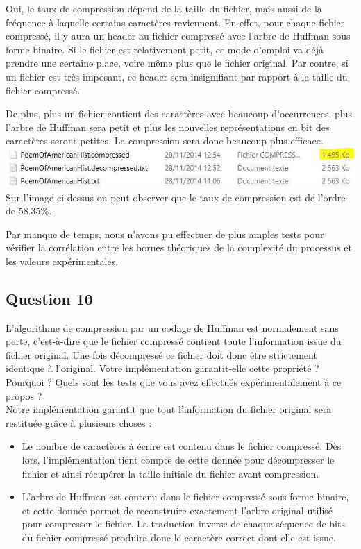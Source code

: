 \documentclass[11pt]{article}
\begin{document}
Oui, le taux de compression dépend de la taille du fichier, mais aussi de la fréquence à laquelle certains caractères	reviennent. En effet, pour chaque fichier compressé, il y aura un header au fichier compressé avec l'arbre de Huffman sous forme binaire. Si le fichier est relativement petit, ce mode d'emploi va déjà prendre une certaine place, voire même plus que le fichier original. Par contre, si un fichier est très imposant, ce header sera insignifiant par rapport à la taille du fichier compressé.

De plus, plus un fichier contient des caractères avec beaucoup d'occurrences, plus l'arbre de Huffman sera petit et plus les nouvelles représentations en bit des caractères seront petites. La compression sera donc beaucoup plus efficace. \\

\includegraphics[scale=0.5]{compression.jpg}\\

Sur l'image ci-dessus on peut observer que le taux de compression est de l'ordre de 58.35\%.

Par manque de temps, nous n'avons pu effectuer de plus amples tests pour vérifier la corrélation entre les bornes théoriques de la complexité du processus et les valeurs expérimentales.

\subsection*{Question 10}
L'algorithme de compression par un codage de Huffman est normalement sans perte, c'est-à-dire que le fichier compressé contient toute l'information issue du fichier original. Une fois décompressé ce fichier doit donc être strictement identique à l'original. Votre implémentation garantit-elle cette propriété ? Pourquoi ? Quels sont les tests que vous avez effectués expérimentalement à ce propos ? \\

Notre implémentation garantit que tout l'information du fichier original sera restituée grâce à plusieurs choses : \\

\begin{itemize}
	\item Le nombre de caractères à écrire est contenu dans le fichier compressé. Dès lors, l'implémentation tient compte de cette donnée pour décompresser le fichier et ainsi récupérer la taille initiale du fichier avant compression.
	\item L'arbre de Huffman est contenu dans le fichier compressé sous forme binaire, et cette donnée permet de reconstruire exactement l'arbre original utilisé pour compresser le fichier. La traduction inverse de chaque séquence de bits du fichier compressé produira donc le caractère correct dont elle est issue.\\
\end{itemize}
\end{document}
